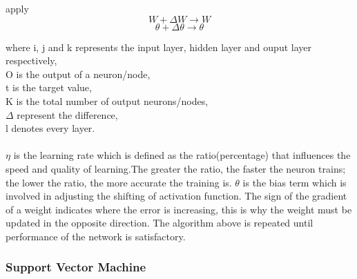 {\begin{enumerate}[(i)]
                apply
                \begin{equation}
                        W + \Delta W \to W
                \end{equation}
                \begin{equation}
                        \theta + \Delta\theta \to \theta
                \end{equation}
\end{enumerate}
where i, j and k represents the input layer, hidden layer and ouput layer respectively,\\
O is the output of a neuron/node,\\
t is the target value,\\
K is the total number of output neurons/nodes,\\
$\Delta$ represent the difference,\\
l denotes every layer.\\
\\
$\eta$ is the learning rate which is defined as the ratio(percentage) that influences the speed and quality of learning.The greater the ratio, the faster the neuron trains;
the lower the ratio, the more accurate the training is. $\theta$ is the bias term which is involved in adjusting the shifting of activation function. The sign of the gradient
of a weight indicates where the error is increasing, this is why the weight must be updated in the opposite direction. The algorithm above is
repeated until performance of the network is satisfactory.

\subsubsection{Support Vector Machine}

}
